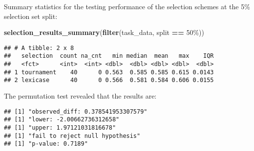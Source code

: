 \documentclass[
]{book}
\newenvironment{Shaded}{\begin{snugshade}}{\end{snugshade}}
\newcommand{\AttributeTok}[1]{\textcolor[rgb]{0.13,0.29,0.53}{#1}}
\newcommand{\DecValTok}[1]{\textcolor[rgb]{0.00,0.00,0.81}{#1}}
\newcommand{\FunctionTok}[1]{\textcolor[rgb]{0.13,0.29,0.53}{\textbf{#1}}}
\newcommand{\NormalTok}[1]{#1}
\newcommand{\OtherTok}[1]{\textcolor[rgb]{0.56,0.35,0.01}{#1}}
\newcommand{\SpecialCharTok}[1]{\textcolor[rgb]{0.81,0.36,0.00}{\textbf{#1}}}
\newcommand{\StringTok}[1]{\textcolor[rgb]{0.31,0.60,0.02}{#1}}
\begin{document}
Summary statistics for the testing performance of the selection schemes at the 5\% selection set split:

\begin{Shaded}
\begin{Highlighting}[]
\FunctionTok{selection\_results\_summary}\NormalTok{(}\FunctionTok{filter}\NormalTok{(task\_data, split }\SpecialCharTok{==} \StringTok{\textquotesingle{}50\%\textquotesingle{}}\NormalTok{))}
\end{Highlighting}
\end{Shaded}

\begin{verbatim}
## # A tibble: 2 x 8
##   selection  count na_cnt   min median  mean   max    IQR
##   <fct>      <int>  <int> <dbl>  <dbl> <dbl> <dbl>  <dbl>
## 1 tournament    40      0 0.563  0.585 0.585 0.615 0.0143
## 2 lexicase      40      0 0.566  0.581 0.584 0.606 0.0155
\end{verbatim}

The permutation test revealed that the results are:

\begin{Shaded}
\end{Shaded}

\begin{verbatim}
## [1] "observed_diff: 0.378541953307579"
## [1] "lower: -2.00662736312658"
## [1] "upper: 1.97121031816678"
## [1] "fail to reject null hypothesis"
## [1] "p-value: 0.7189"
\end{verbatim}
\end{document}
